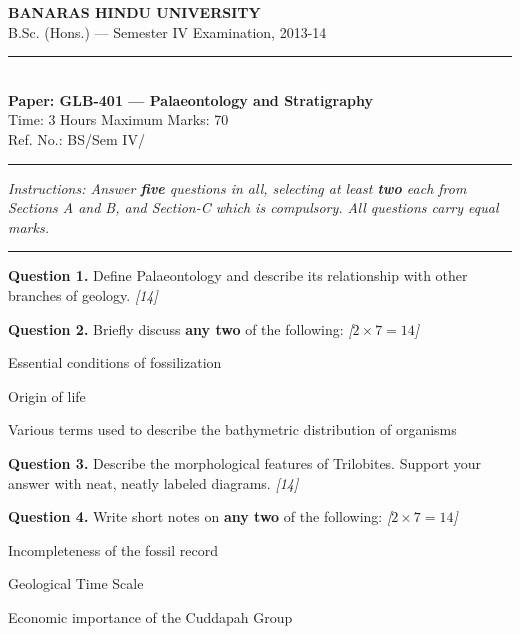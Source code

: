 \documentclass[11pt,a4paper]{article}
\newcommand{\pts}[1]{\hfill   \textit{[#1]}}
\begin{document}
\begin{center}
  {\large\bfseries BANARAS HINDU UNIVERSITY}\\[2pt]
  {\normalsize B.Sc. (Hons.) --- Semester IV Examination, 2013-14}\\[6pt]
  \rule{0.8\linewidth}{0.5pt}\\[6pt]
  {\large\bfseries Paper: GLB-401 --- Palaeontology and Stratigraphy}\\[4pt]
  {\normalsize Time: 3 Hours \hfill Maximum Marks: 70}\\[2pt]
  {\small Ref. No.: BS/Sem IV/}
\end{center}
\rule{\linewidth}{0.4pt}
\smallskip



\noindent   \textit{Instructions: Answer   \textbf{five} questions in all, selecting at least   \textbf{two} each from Sections A and B, and Section-C which is compulsory. All questions carry equal marks.}
\bigskip

\bigskip


\rule{\linewidth}{0.4pt}\smallskip




\noindent   \textbf{Question 1.} Define Palaeontology and describe its relationship with other branches of geology. \pts{14}

\medskip


\noindent   \textbf{Question 2.} Briefly discuss   \textbf{any two} of the following: \pts{$2  \times 7 = 14$}

\begin{parts}
  \item Essential conditions of fossilization
  \item Origin of life
  \item Various terms used to describe the bathymetric distribution of organisms
\end{parts}

\medskip


\noindent   \textbf{Question 3.} Describe the morphological features of Trilobites. Support your answer with neat, neatly labeled diagrams. \pts{14}

\medskip


\noindent   \textbf{Question 4.} Write short notes on   \textbf{any two} of the following: \pts{$2  \times 7 = 14$}

\begin{parts}
  \item Incompleteness of the fossil record
  \item Geological Time Scale
  \item Economic importance of the Cuddapah Group
\end{parts}
\end{document}
